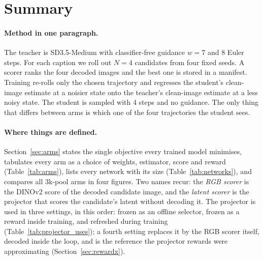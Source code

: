 \documentclass[11pt,a4paper]{article}
\begin{document}
\begin{abstract}
FID rather than adding cleanly; the same reward on two stronger teachers moves CompBench in the same direction as on the 8-step teacher but is not statistically resolved at three seeds. The same pipeline with VQAScore as the scorer gives similar gains but shares a model family with the evaluators. This document gives the full recipe: data, model, scorers, loss, hyperparameters, evaluation protocol, results, ablations and qualitative examples.
\end{abstract}

\tableofcontents

\section{Summary}

\paragraph{Method in one paragraph.}
The teacher is SD3.5-Medium with classifier-free guidance $w=7$ and 8 Euler steps. For each caption we roll out $N=4$ candidates from four fixed seeds. A scorer ranks the four decoded images and the best one is stored in a manifest. Training re-rolls only the chosen trajectory and regresses the student's clean-image estimate at a noisier state onto the teacher's clean-image estimate at a less noisy state. The student is sampled with 4 steps and no guidance. The only thing that differs between arms is which one of the four trajectories the student sees.

\paragraph{Where things are defined.} Section~\ref{sec:arms} states the single objective every trained model minimises, tabulates every arm as a choice of weights, estimator, score and reward (Table~\ref{tab:arms}), lists every network with its size (Table~\ref{tab:networks}), and compares all 3k-pool arms in four figures. Two names recur: the \emph{RGB scorer} is the DINOv2 score of the decoded candidate image, and the \emph{latent scorer} is the projector that scores the candidate's latent without decoding it. The projector is used in three settings, in this order: frozen as an offline selector, frozen as a reward inside training, and refreshed during training (Table~\ref{tab:projector_uses}); a fourth setting replaces it by the RGB scorer itself, decoded inside the loop, and is the reference the projector rewards were approximating (Section~\ref{sec:rewardx}).
\end{document}

